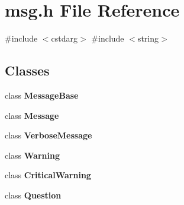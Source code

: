 \section{msg.\+h File Reference}
\label{msg_8h}
{\ttfamily \#include $<$cstdarg$>$}\newline
{\ttfamily \#include $<$string$>$}\newline
\subsection*{Classes}
\begin{DoxyCompactItemize}
\item 
class \textbf{ Message\+Base}
\item 
class \textbf{ Message}
\item 
class \textbf{ Verbose\+Message}
\item 
class \textbf{ Warning}
\item 
class \textbf{ Critical\+Warning}
\item 
class \textbf{ Question}
\end{DoxyCompactItemize}
